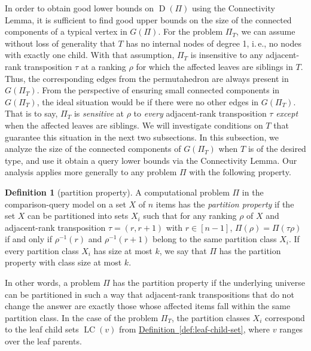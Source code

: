 \documentclass[11pt]{article}
\numberwithin{equation}{section}
\theoremstyle{definition}
\newtheorem{definition}[theorem]{Definition}
\theoremstyle{plain}
\newcommand{\ie}{i.\,e.}
\newcommand{\expref}[2]{\hyperref[#2]{#1~\ref{#2}}}
\DeclareMathOperator{\leafchildset}{LC}
\newcommand{\ranking}{\rho}
\newcommand{\transposition}{\tau}
\DeclareMathOperator{\traces}{D}
\begin{document}
In order to obtain good lower bounds on $\traces(\Pi)$ using the Connectivity Lemma, it is sufficient to find good upper bounds on the size of the connected components of a typical vertex in $G(\Pi)$. For the problem $\Pi_T$, we can assume without loss of generality that $T$ has no internal nodes of degree 1, \ie, no nodes with exactly one child. With that assumption, $\Pi_T$ is insensitive to any adjacent-rank transposition $\transposition$ at a ranking $\ranking$ for which the affected leaves are siblings in $T$. Thus, the corresponding edges from the permutahedron are always present in $G(\Pi_T)$. From the perspective of ensuring small connected components in $G(\Pi_T)$, the ideal situation would be if there were no other edges in $G(\Pi_T)$. That is to say, $\Pi_T$ is \emph{sensitive} at $\ranking$ to \emph{every} adjacent-rank transposition $\transposition$ \emph{except} when the affected leaves are siblings. We will investigate conditions on $T$ that guarantee this situation in the next two subsections. In this subsection, we analyze the size of the connected components of $G(\Pi_T)$ when $T$ is of the desired type, and use it obtain a query lower bounds via the Connectivity Lemma. Our analysis applies more generally to any problem $\Pi$ with the following property.
\begin{definition}[partition property]\label{def:partition-property}
A computational problem $\Pi$ in the comparison-query model on a set $X$ of $n$ items has the \emph{partition property} if the set $X$ can be partitioned into sets $X_i$ such that for any ranking $\ranking$ of $X$ and adjacent-rank transposition $\transposition = (r, r+1)$ with $r \in [n-1]$, $\Pi(\ranking) = \Pi(\transposition \ranking)$ if and only if $\ranking^{-1}(r)$ and $\ranking^{-1}(r+1)$ belong to the same partition class $X_i$. If every partition class $X_i$ has size at most $k$, we say that $\Pi$ has the partition property with class size at most $k$.
\end{definition}
In other words, a problem $\Pi$ has the partition property if the underlying universe can be partitioned in such a way that 
adjacent-rank transpositions that do not change the answer are exactly those whose affected items fall within the same partition class. In the case of the problem $\Pi_T$, the partition classes $X_i$ correspond to the leaf child sets $\leafchildset(v)$ from \expref{Definition}{def:leaf-child-set}, where $v$ ranges over the leaf parents.
\end{document}
